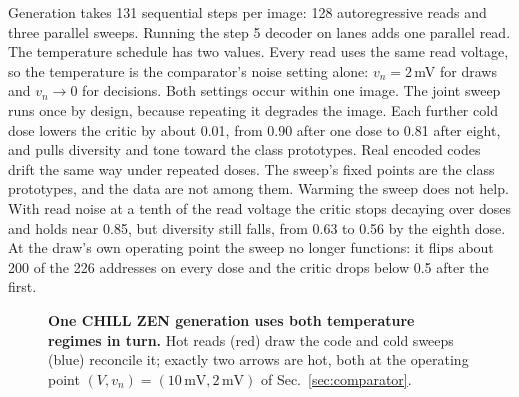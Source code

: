 \documentclass[reprint,amsmath,amssymb,aps,nofootinbib]{revtex4-2}
\begin{document}
Generation takes 131 sequential steps per image: 128 autoregressive
reads and three parallel sweeps. Running the step 5 decoder on lanes
adds one parallel read. The
temperature schedule has two values. Every
read uses the same read voltage, so the temperature is the
comparator's noise setting alone: $v_n = 2$\,mV for draws and
$v_n \to 0$ for decisions. Both settings occur within one image.
The joint sweep runs once by design, because repeating it degrades
the image. Each further cold dose lowers the critic by about 0.01,
from 0.90 after one dose to 0.81 after eight, and pulls diversity and
tone toward the class prototypes. Real encoded codes drift the same
way under repeated doses. The sweep's fixed points are the class
prototypes, and the data are not among them.
Warming the sweep does not help. With read noise at a
tenth of the read voltage the critic stops decaying over doses and
holds near 0.85, but diversity still falls, from 0.63 to 0.56 by the
eighth dose. At the draw's own operating point the sweep no longer
functions: it flips about 200 of the 226 addresses on every dose and
the critic drops below 0.5 after the first.

\begin{figure}
\caption{\textbf{One CHILL ZEN generation uses both temperature
regimes in turn.} Hot reads (red) draw the code and cold sweeps (blue)
reconcile it; exactly two arrows are hot, both at the operating point
$(V, v_n) = (10\,\mathrm{mV}, 2\,\mathrm{mV})$ of
Sec.~\ref{sec:comparator}.}
\label{fig:arch}
\end{figure}
\end{document}
